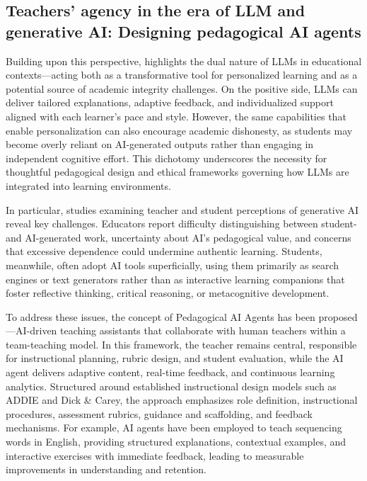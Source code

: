 
\subsection{Teachers’ agency in the era of LLM and generative AI: Designing pedagogical AI agents}

Building upon this perspective, \cite{Lan2024} highlights the 
dual nature of LLMs in educational contexts—acting both as a 
transformative tool for personalized learning and as a 
potential source of academic integrity challenges. On the 
positive side, LLMs can deliver tailored explanations, 
adaptive feedback, and individualized support aligned with 
each learner’s pace and style. However, the same capabilities 
that enable personalization can also encourage academic 
dishonesty, as students may become overly reliant on 
AI-generated outputs rather than engaging in independent 
cognitive effort. This dichotomy underscores the necessity 
for thoughtful pedagogical design and ethical frameworks 
governing how LLMs are integrated into learning environments.

In particular, studies examining teacher and student perceptions 
of generative AI reveal key challenges. Educators report 
difficulty distinguishing between student- and AI-generated 
work, uncertainty about AI’s pedagogical value, and concerns 
that excessive dependence could undermine authentic learning. 
Students, meanwhile, often adopt AI tools superficially, using 
them primarily as search engines or text generators rather 
than as interactive learning companions that foster reflective 
thinking, critical reasoning, or metacognitive development.

To address these issues, the concept of Pedagogical AI Agents 
has been proposed—AI-driven teaching assistants that collaborate 
with human teachers within a team-teaching model. In this 
framework, the teacher remains central, responsible for 
instructional planning, rubric design, and student evaluation, 
while the AI agent delivers adaptive content, real-time 
feedback, and continuous learning analytics. Structured around 
established instructional design models such as 
ADDIE and Dick \& Carey, the approach emphasizes role 
definition, instructional procedures, assessment rubrics, 
guidance and scaffolding, and feedback mechanisms. For example, 
AI agents have been employed to teach sequencing words in 
English, providing structured explanations, contextual examples, 
and interactive exercises with immediate feedback, leading to 
measurable improvements in understanding and retention.

